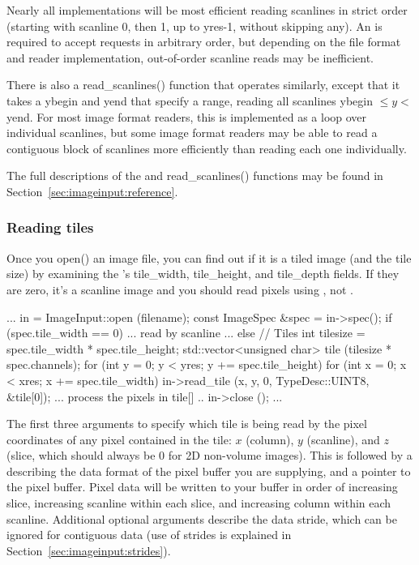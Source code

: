 Nearly all \ImageInput implementations will be most efficient reading
scanlines in strict order (starting with scanline 0, then 1, up to {\kw
  yres-1}, without skipping any).  An \ImageInput is required to accept
\readscanline requests in arbitrary order, but depending on the file
format and reader implementation, out-of-order scanline reads may be
inefficient.

There is also a {\cf read_scanlines()} function that operates similarly,
except that it takes a {\cf ybegin} and {\cf yend} that specify a range,
reading all scanlines {\cf ybegin} $\le y <$ {\cf yend}.  For most image
format readers, this is implemented as a loop over individual scanlines,
but some image format readers may be able to read a contiguous block of
scanlines more efficiently than reading each one individually.

The full descriptions of the \readscanline and {\cf read_scanlines()}
functions may be found in Section~\ref{sec:imageinput:reference}.

\subsubsection{Reading tiles}

Once you {\kw open()} an image file, you can find out if it is a tiled
image (and the tile size) by examining the \ImageSpec's {\cf
  tile_width}, {\cf tile_height}, and {\cf tile_depth} fields.
If they are zero, it's a scanline image and you should read pixels
using \readscanline, not \readtile.

\begin{code}
        ...
        in = ImageInput::open (filename);
        const ImageSpec &spec = in->spec();
        if (spec.tile_width == 0) {
            ... read by scanline ...
        } else {
            // Tiles
            int tilesize = spec.tile_width * spec.tile_height;
            std::vector<unsigned char> tile (tilesize * spec.channels);
            for (int y = 0;  y < yres;  y += spec.tile_height) {
                for (int x = 0;  x < xres;  x += spec.tile_width) {
                    in->read_tile (x, y, 0, TypeDesc::UINT8, &tile[0]);
                    ... process the pixels in tile[] ..
                }
            }
        }
        in->close ();
        ...
\end{code}

The first three arguments to \readtile specify which tile is
being read by the pixel coordinates of any pixel contained in the
tile: $x$ (column), $y$ (scanline), and $z$ (slice, which should always
be 0 for 2D non-volume images).  This is followed by a \TypeDesc
describing the data format of the pixel buffer you are supplying, and a
pointer to the pixel buffer.  Pixel data will be written to your buffer
in order of increasing slice, increasing
scanline within each slice, and increasing column within each scanline.
Additional optional arguments describe the data stride, which can be
ignored for contiguous data (use of strides is explained in
Section~\ref{sec:imageinput:strides}).

